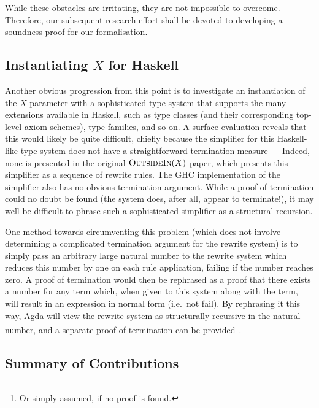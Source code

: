 \documentclass[a4paper]{jfp}
\newcommand{\outsidein}{\textsc{OutsideIn}(X)}
\begin{document}
While these obstacles are irritating, they are not impossible to overcome. Therefore, our subsequent research effort shall be devoted to developing a
soundness proof for our formalisation. 

\subsection{Instantiating $X$ for Haskell}
\label{subsec:haskell}

Another obvious progression from this point is to investigate an instantiation of the $X$ parameter with a sophisticated type system that supports the
many extensions available in Haskell, such as type classes (and their corresponding top-level axiom schemes), type families, and so on. A surface
evaluation reveals that this would likely be quite difficult, chiefly because the simplifier for this Haskell-like type system does not have a
straightforward termination measure --- Indeed, none is presented in the original $\outsidein$ paper, which presents this simplifier as a sequence of
rewrite rules. The GHC implementation of the simplifier also has no obvious termination argument.  While a proof of termination could no doubt be
found (the system does, after all, appear to terminate!), it may well be difficult to phrase such a sophisticated simplifier as a structural
recursion.

One method towards circumventing this problem (which does not involve determining a complicated termination argument for the rewrite system) is to
simply pass an arbitrary large natural number to the rewrite system which reduces this number by one on each rule application, failing if the number
reaches zero. A proof of termination would then be rephrased as a proof that there exists a number for any term which, when given to this system along
with the term, will result in an expression in normal form (i.e.\ not fail). By rephrasing it this way, Agda will view the rewrite system as
structurally recursive in the natural number, and a separate proof of termination can be provided\footnote{Or simply assumed, if no proof is found.}.  


\subsection{Summary of Contributions}
\end{document}
